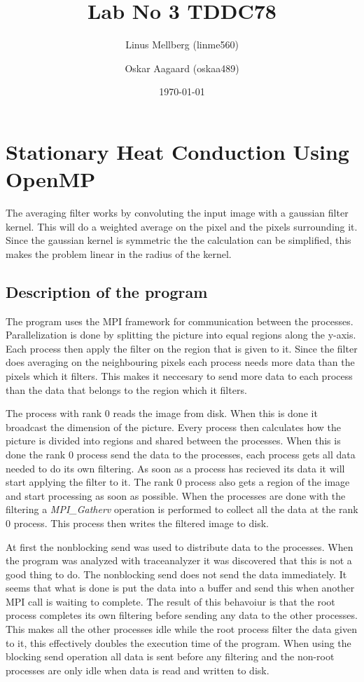 \documentclass[a4paper,11pt]{article}
\begin{document}
\title{Lab No 3 TDDC78}
\author{Linus Mellberg (linme560) \and Oskar Aagaard (oskaa489)}
\date{\today}
\maketitle
\pagebreak
\thispagestyle{tcr}
\pagestyle{tcr}

\section{Stationary Heat Conduction Using OpenMP}



The averaging filter works by convoluting the input image with a gaussian filter kernel.
This will do a weighted average on the pixel and the pixels surrounding it.
Since the gaussian kernel is symmetric the the calculation can be simplified, this makes the problem linear in the radius of the kernel.
\subsection{Description of the program}
The program uses the MPI framework for communication between the processes.
Parallelization is done by splitting the picture into equal regions along the y-axis.
Each process then apply the filter on the region that is given to it. 
Since the filter does averaging on the neighbouring pixels each process needs more data than the pixels which it filters.
This makes it neccesary to send more data to each process than the data that belongs to the region which it filters.

The process with rank 0 reads the image from disk.
When this is done it broadcast the dimension of the picture.
Every process then calculates how the picture is divided into regions and shared between the processes.
When this is done the rank 0 process send the data to the processes, each process gets all data needed to do its own filtering.
As soon as a process has recieved its data it will start applying the filter to it.
The rank 0 process also gets a region of the image and start processing as soon as possible.
When the processes are done with the filtering a \emph{MPI\_Gatherv} operation is performed to collect all the data at the rank 0 process.
This process then writes the filtered image to disk.

At first the nonblocking send was used to distribute data to the processes.
When the program was analyzed with traceanalyzer it was discovered that this is not a good thing to do.
The nonblocking send does not send the data immediately.
It seems that what is done is put the data into a buffer and send this when another MPI call is waiting to complete.
The result of this behavoiur is that the root process completes its own filtering before sending any data to the other processes.
This makes all the other processes idle while the root process filter the data given to it, this effectively doubles the execution time of the program.
When using the blocking send operation all data is sent before any filtering and the non-root processes are only idle when data is read and written to disk.
\end{document}

